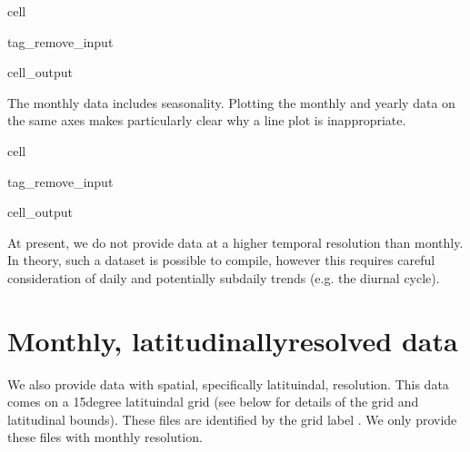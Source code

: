 \documentclass[letterpaper,10pt,english]{jupyterBook}
\begin{document}
\begin{sphinxuseclass}{cell}
\begin{sphinxuseclass}{tag_remove_input}\begin{sphinxVerbatimOutput}

\begin{sphinxuseclass}{cell_output}
\noindent{}

\end{sphinxuseclass}\end{sphinxVerbatimOutput}

\end{sphinxuseclass}
\end{sphinxuseclass}
\sphinxAtStartPar
The monthly data includes seasonality.
Plotting the monthly and yearly data
on the same axes makes particularly clear
why a line plot is inappropriate.

\begin{sphinxuseclass}{cell}
\begin{sphinxuseclass}{tag_remove_input}\begin{sphinxVerbatimOutput}

\begin{sphinxuseclass}{cell_output}
\noindent{}

\end{sphinxuseclass}\end{sphinxVerbatimOutput}

\end{sphinxuseclass}
\end{sphinxuseclass}
\sphinxAtStartPar
At present, we do not provide data at a higher temporal resolution than monthly.
In theory, such a dataset is possible to compile,
however this requires careful consideration of daily
and potentially sub\sphinxhyphen{}daily trends (e.g. the diurnal cycle).


\section{Monthly\sphinxhyphen{}, latitudinally\sphinxhyphen{}resolved data}
\label{\detokenize{user-guide-historical:monthly-latitudinally-resolved-data}}
\sphinxAtStartPar
We also provide data with spatial,
specifically latituindal, resolution.
This data comes on a 15\sphinxhyphen{}degree latituindal grid
(see below for details of the grid and latitudinal bounds).
These files are identified by the grid label .
We only provide these files with monthly resolution.
\end{document}
